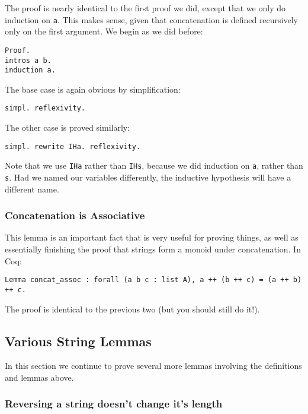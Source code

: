 The proof is nearly identical to the first proof we did, except that we only do induction on \texttt{a}.
This makes sense, given that concatenation is defined recursively only on the first argument.
We begin as we did before:

\begin{verbatim}
Proof.
intros a b.
induction a.
\end{verbatim}

The base case is again obvious by simplification:

\begin{verbatim}
simpl. reflexivity.
\end{verbatim}

The other case is proved similarly:

\begin{verbatim}
simpl. rewrite IHa. reflexivity.
\end{verbatim}

Note that we use \texttt{IHa} rather than \texttt{IHs}, because we did induction on \texttt{a}, rather than \texttt{s}.
Had we named our variables differently, the inductive hypothesis will have a different name.

\subsubsection{Concatenation is Associative}

This lemma is an important fact that is very useful for proving things, as well as essentially finishing the proof that strings form a monoid under concatenation.
In Coq:

\begin{verbatim}
Lemma concat_assoc : forall (a b c : list A), a ++ (b ++ c) = (a ++ b) ++ c.
\end{verbatim}

The proof is identical to the previous two (but you should still do it!).

\subsection{Various String Lemmas}

In this section we continue to prove several more lemmas involving the definitions and lemmas above.

\subsubsection{Reversing a string doesn't change it's length}

